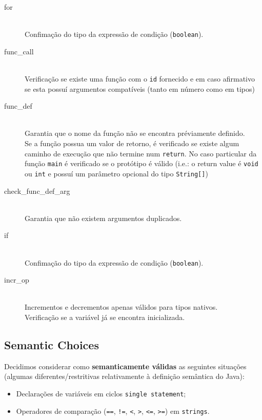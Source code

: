 \documentclass[a4paper]{article}
\begin{document}
\begin{description}
	\item [for] \hfill \\
		Confimação do tipo da expressão de condição (\texttt{boolean}).

	\item [func\_call] \hfill \\
		Verificação se existe uma função com o \texttt{id} fornecido e em caso afirmativo se esta possuí argumentos compatíveis
		(tanto em número como em tipos)
		
	\item [func\_def] \hfill \\
		Garantia que o nome da função não se encontra préviamente definido. \\
		Se a função possua um valor de retorno, é verificado se existe algum caminho de execução que não termine num \texttt{return}.
		No caso particular da função \texttt{main} é verificado se o protótipo é válido
		(i.e.: o return value é \texttt{void} ou \texttt{int} e possuí um parâmetro opcional do tipo \texttt{String[]})
		
	\item [check\_func\_def\_arg] \hfill \\
		Garantia que não existem argumentos duplicados.

	\item [if] \hfill \\
		Confimação do tipo da expressão de condição (\texttt{boolean}).

	\item [incr\_op] \hfill \\
		Incrementos e decrementos apenas válidos para tipos nativos. \\
		Verificação se a variável já se encontra inicializada.

\end{description}

\subsection{Semantic Choices}
\label{semantic_choices}
\indent \indent Decidimos considerar como \textbf{semanticamente válidas} as seguintes situações (algumas diferentes/restritivas relativamente à definição semântica do Java):
\begin{itemize}
	\item Declarações de variáveis em ciclos \texttt{single statement};
	\item Operadores de comparação (\texttt{==}, \texttt{!=}, \texttt{<}, \texttt{>}, \texttt{<=}, \texttt{>=}) em \texttt{strings}.
\end{itemize}
\end{document}
